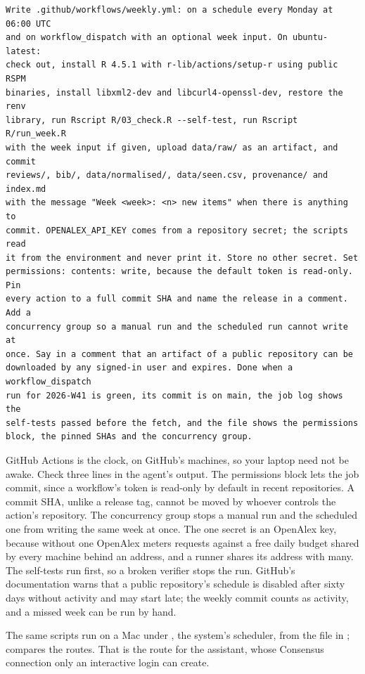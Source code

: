 \begin{lstlisting}[caption={The sixth prompt}]
Write .github/workflows/weekly.yml: on a schedule every Monday at 06:00 UTC
and on workflow_dispatch with an optional week input. On ubuntu-latest:
check out, install R 4.5.1 with r-lib/actions/setup-r using public RSPM
binaries, install libxml2-dev and libcurl4-openssl-dev, restore the renv
library, run Rscript R/03_check.R --self-test, run Rscript R/run_week.R
with the week input if given, upload data/raw/ as an artifact, and commit
reviews/, bib/, data/normalised/, data/seen.csv, provenance/ and index.md
with the message "Week <week>: <n> new items" when there is anything to
commit. OPENALEX_API_KEY comes from a repository secret; the scripts read
it from the environment and never print it. Store no other secret. Set
permissions: contents: write, because the default token is read-only. Pin
every action to a full commit SHA and name the release in a comment. Add a
concurrency group so a manual run and the scheduled run cannot write at
once. Say in a comment that an artifact of a public repository can be
downloaded by any signed-in user and expires. Done when a workflow_dispatch
run for 2026-W41 is green, its commit is on main, the job log shows the
self-tests passed before the fetch, and the file shows the permissions
block, the pinned SHAs and the concurrency group.
\end{lstlisting}

GitHub Actions is the clock, on GitHub's machines, so your laptop need not be
awake. Check three lines in the agent's output. The permissions block lets
the job commit, since a workflow's token is read-only by default in recent
repositories. A commit SHA, unlike a release tag, cannot be moved by whoever
controls the action's repository. The concurrency group stops a manual run
and the scheduled one from writing the same week at once. The one secret is
an OpenAlex key, because without one OpenAlex meters requests against a free
daily budget shared by every machine behind an address, and a runner shares
its address with many. The self-tests run first, so a broken verifier stops
the run. GitHub's documentation warns that a public repository's schedule is
disabled after sixty days without activity and may start late; the weekly
commit counts as activity, and a missed week can be run by hand.

The same scripts run on a Mac under , the system's scheduler,
from the file in ;  compares the
routes. That is the route for the assistant, whose Consensus connection only
an interactive login can create.

